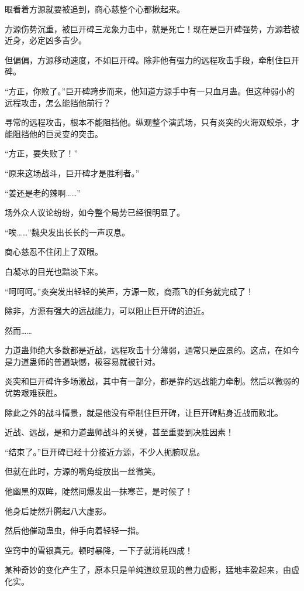 
\begin{this_body}

眼看着方源就要被追到，商心慈整个心都揪起来。

方源伤势沉重，被巨开碑三龙象力击中，就是死亡！现在是巨开碑强势，方源若被近身，必定凶多吉少。

但偏偏，方源移动速度，不如巨开碑。除非他有强力的远程攻击手段，牵制住巨开碑。

“方正，你败了。”巨开碑跨步而来，他知道方源手中有一只血月蛊。但这种弱小的远程攻击，怎么能挡他前行？

寻常的远程攻击，根本不能阻挡他。纵观整个演武场，只有炎突的火海双蛟杀，才能阻挡他的巨灵变的突击。

“方正，要失败了！”

“原来这场战斗，巨开碑才是胜利者。”

“姜还是老的辣啊……”

场外众人议论纷纷，如今整个局势已经很明显了。

“唉……”魏央发出长长的一声叹息。

商心慈忍不住闭上了双眼。

白凝冰的目光也黯淡下来。

“呵呵呵。”炎突发出轻轻的笑声，方源一败，商燕飞的任务就完成了！

除非，方源有强大的远战能力，可以阻止巨开碑的迫近。

然而……

力道蛊师绝大多数都是近战，远程攻击十分薄弱，通常只是应景的。这点，在如今是力道蛊师的普遍缺憾，极容易就被针对。

炎突和巨开碑许多场激战，其中有一部分，都是靠的远战能力牵制。然后以微弱的优势艰难获胜。

除此之外的战斗情景，就是他没有牵制住巨开碑，让巨开碑贴身近战而败北。

近战、远战，是和力道蛊师战斗的关键，甚至重要到决胜因素！

“结束了。”巨开碑已经十分接近方源，不少人扼腕叹息。

但就在此时，方源的嘴角绽放出一丝微笑。

他幽黑的双眸，陡然间爆发出一抹寒芒，是时候了！

他身后陡然升腾起八大虚影。

然后他催动蛊虫，伸手向着轻轻一指。

空窍中的雪银真元。顿时暴降，一下子就消耗四成！

某种奇妙的变化产生了，原本只是单纯道纹显现的兽力虚影，猛地丰盈起来，由虚化实。


\end{this_body}
